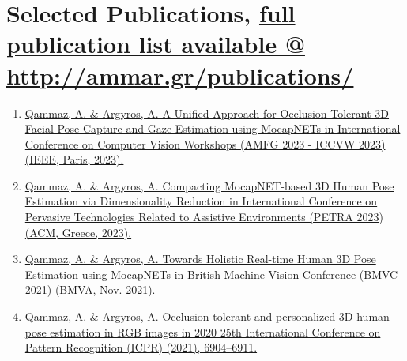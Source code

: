 \documentclass[a4,8pt]{article}
\begin{document}
\section{Selected Publications, \href{http://ammar.gr/publications/}{full publication list available @ http://ammar.gr/publications/} } 
\linespread{0.6}
\begin{enumerate}[itemsep=-1mm]

  
  \item \href{http://users.ics.forth.gr/~argyros/mypapers/2023_10_AMFG_Qammaz.pdf}{Qammaz, A. \& Argyros, A. A Unified Approach for Occlusion Tolerant 3D Facial Pose Capture and Gaze Estimation using MocapNETs in International Conference on Computer Vision Workshops (AMFG 2023 - ICCVW 2023) (IEEE, Paris, 2023).}
  
  \item \href{http://users.ics.forth.gr/~argyros/mypapers/2023_07_PETRA_Qammaz.pdf}{Qammaz, A. \& Argyros, A. Compacting MocapNET-based 3D Human Pose Estimation via Dimensionality Reduction in International Conference on Pervasive Technologies Related to Assistive Environments (PETRA 2023) (ACM, Greece, 2023).}

  
  \item \href{http://users.ics.forth.gr/~argyros/mypapers/2021_11_BMVC_Qammaz.pdf}{Qammaz, A. \& Argyros, A. Towards Holistic Real-time Human 3D Pose Estimation using MocapNETs in British Machine Vision Conference (BMVC 2021) (BMVA, Nov. 2021).}
  
  \item \href{http://users.ics.forth.gr/~argyros/mypapers/2021_01_ICPR_Qammaz.pdf}{Qammaz, A. \& Argyros, A. Occlusion-tolerant and personalized 3D human pose estimation in RGB images in 2020 25th International Conference on Pattern Recognition (ICPR) (2021), 6904–6911.}
  

\end{enumerate}
\end{document}
